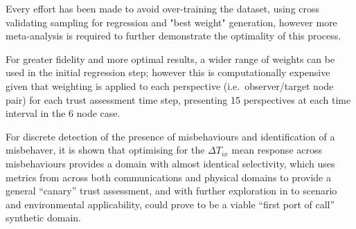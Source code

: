 Every effort has been made to avoid over-training the dataset, using cross validating sampling for regression and "best weight" generation, however more meta-analysis is required to further demonstrate the optimality of this process.

For greater fidelity and more optimal results, a wider range of weights can be used in the initial regression step; however this is computationally expensive given that weighting is applied to each perspective (i.e.\ observer/target node pair) for each trust assessment time step, presenting 15 perspectives at each time interval in the 6 node case.

For discrete detection of the presence of misbehaviours and identification of a misbehaver, it is shown that optimising for the $\Delta T_{ix}$ mean response across misbehaviours provides a domain with almost identical selectivity, which uses metrics from across both communications and physical domains to provide a general ``canary'' trust assessment, and with further exploration in to scenario and environmental applicability, could prove to be a viable ``first port of call'' synthetic domain.





